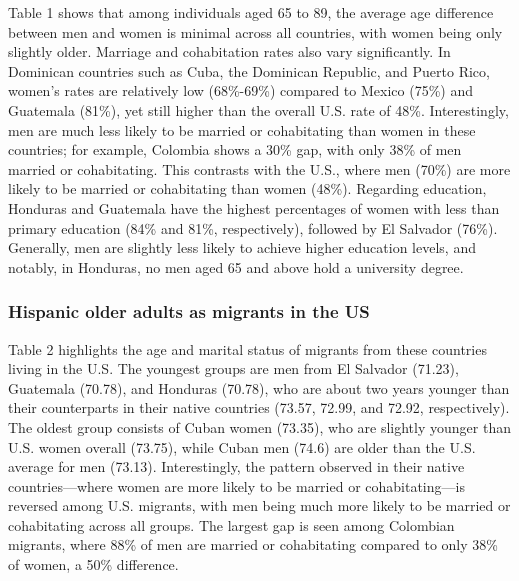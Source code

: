 \documentclass[
]{article}
\begin{document}
Table 1 shows that among individuals aged 65 to 89, the average age
difference between men and women is minimal across all countries, with
women being only slightly older. Marriage and cohabitation rates also
vary significantly. In Dominican countries such as Cuba, the Dominican
Republic, and Puerto Rico, women's rates are relatively low (68\%-69\%)
compared to Mexico (75\%) and Guatemala (81\%), yet still higher than
the overall U.S. rate of 48\%. Interestingly, men are much less likely
to be married or cohabitating than women in these countries; for
example, Colombia shows a 30\% gap, with only 38\% of men married or
cohabitating. This contrasts with the U.S., where men (70\%) are more
likely to be married or cohabitating than women (48\%). Regarding
education, Honduras and Guatemala have the highest percentages of women
with less than primary education (84\% and 81\%, respectively), followed
by El Salvador (76\%). Generally, men are slightly less likely to
achieve higher education levels, and notably, in Honduras, no men aged
65 and above hold a university degree.

\subsubsection{Hispanic older adults as migrants in the
US}\label{hispanic-older-adults-as-migrants-in-the-us}

Table 2 highlights the age and marital status of migrants from these
countries living in the U.S. The youngest groups are men from El
Salvador (71.23), Guatemala (70.78), and Honduras (70.78), who are about
two years younger than their counterparts in their native countries
(73.57, 72.99, and 72.92, respectively). The oldest group consists of
Cuban women (73.35), who are slightly younger than U.S. women overall
(73.75), while Cuban men (74.6) are older than the U.S. average for men
(73.13). Interestingly, the pattern observed in their native
countries---where women are more likely to be married or
cohabitating---is reversed among U.S. migrants, with men being much more
likely to be married or cohabitating across all groups. The largest gap
is seen among Colombian migrants, where 88\% of men are married or
cohabitating compared to only 38\% of women, a 50\% difference.
\end{document}
